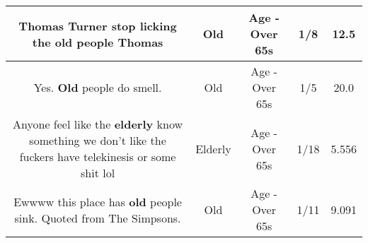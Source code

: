 \documentclass[11pt]{article}
\newlength\mylength
\begin{document}
\begin{center}
\begin{longtable}{|C{.65\mylength}|C{.30\mylength}|C{.12\mylength}|C{.12\mylength}|C{.12\mylength}|}
  \small Thomas Turner stop licking the \textbf{old} people Thomas\normalsize   & Old & Age - Over 65s & 1/8 & 12.5 \\  \hline
  \small Yes. \textbf{Old} people do smell.\normalsize   & Old & Age - Over 65s & 1/5 & 20.0 \\  \hline
  \small Anyone feel like the \textbf{elderly} know something we don't like the fuckers have telekinesis or some shit lol\normalsize   & Elderly & Age - Over 65s & 1/18 & 5.556 \\  \hline
  \small Ewwww this place has \textbf{old} people sink. Quoted from The Simpsons.\normalsize   & Old & Age - Over 65s & 1/11 & 9.091 \\  \hline
  
\end{longtable}
\end{center}
\end{document}
